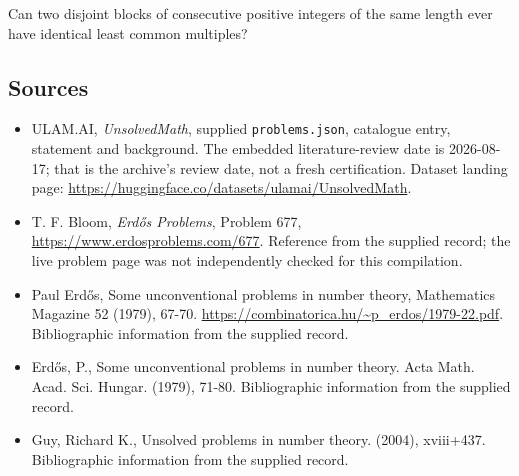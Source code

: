 \documentclass[11pt,a4paper]{article}
\begin{document}
Can two disjoint blocks of consecutive positive integers of the same length ever have identical least common multiples?

\subsection{Sources}

{\small

\begin{itemize}

\item[\hypertarget{source:statement:1}{S1}] ULAM.AI, \emph{UnsolvedMath}, supplied \texttt{problems.json}, catalogue entry, statement and background. The embedded literature-review date is 2026-08-17; that is the archive’s review date, not a fresh certification. Dataset landing page: \url{https://huggingface.co/datasets/ulamai/UnsolvedMath}.

\item[\hypertarget{source:statement:2}{S2}] T. F. Bloom, \emph{Erdős Problems}, Problem 677, \url{https://www.erdosproblems.com/677}. Reference from the supplied record; the live problem page was not independently checked for this compilation.

\item[\hypertarget{source:statement:3}{S3}] Paul Erdős, Some unconventional problems in number theory, Mathematics Magazine 52 (1979), 67-70. \url{https://combinatorica.hu/~p_erdos/1979-22.pdf}. Bibliographic information from the supplied record.

\item[\hypertarget{source:statement:4}{S4}] Erd\H{o}s, P., Some unconventional problems in number theory. Acta Math. Acad. Sci. Hungar. (1979), 71-80. Bibliographic information from the supplied record.

\item[\hypertarget{source:statement:5}{S5}] Guy, Richard K., Unsolved problems in number theory. (2004), xviii+437. Bibliographic information from the supplied record.

\end{itemize}

}

\label{end:statement}
\end{document}

